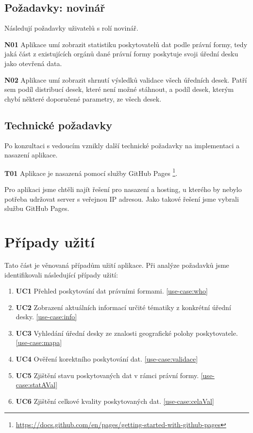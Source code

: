 \subsection{Požadavky: novinář}

Následují požadavky uživatelů s rolí novinář.

    \textbf{N01} Aplikace umí zobrazit statistiku poskytovatelů dat podle právní formy, tedy jaká část z existujících orgánů dané právní formy poskytuje svoji úřední desku jako otevřená data.
    
    \textbf{N02} Aplikace umí zobrazit shrnutí výsledků validace všech úředních desek. Patří sem podíl distribucí desek, které není možné stáhnout, a podíl desek, kterým chybí některé doporučené parametry, ze všech desek.

\subsection{Technické požadavky}\label{sub:tech-poz}

Po konzultaci s vedoucím vznikly další technické požadavky na implementaci a nasazení aplikace.

    \textbf{T01} Aplikace je nasazená pomocí služby GitHub Pages \footnote{\url{https://docs.github.com/en/pages/getting-started-with-github-pages}}.
    
Pro aplikaci jsme chtěli najít řešení pro nasazení a hosting, u kterého by nebylo potřeba udržovat server s veřejnou IP adresou. Jako takové řešení jsme vybrali službu GitHub Pages.

\section{Případy užití} \label{sec:use-cases}

Tato část je věnovaná případům užití aplikace. Při analýze požadavků jsme identifikovali následující případy užití:
\begin{enumerate}
    \item \textbf{UC1} Přehled poskytování dat právními formami. \autoref{use-case:who}
    \item \textbf{UC2} Zobrazení aktuálních informací určité tématiky z konkrétní úřední desky. \autoref{use-case:info}
    \item \textbf{UC3} Vyhledání úřední desky ze znalosti geografické polohy poskytovatele. \autoref{use-case:mapa}
    \item \textbf{UC4} Ověření korektního poskytování dat. \autoref{use-case:validace}
    \item \textbf{UC5} Zjištění stavu poskytovaných dat v rámci právní formy. \autoref{use-case:statAVal}
    \item \textbf{UC6} Zjištění celkové kvality poskytovaných dat. \autoref{use-case:celaVal}
\end{enumerate}

